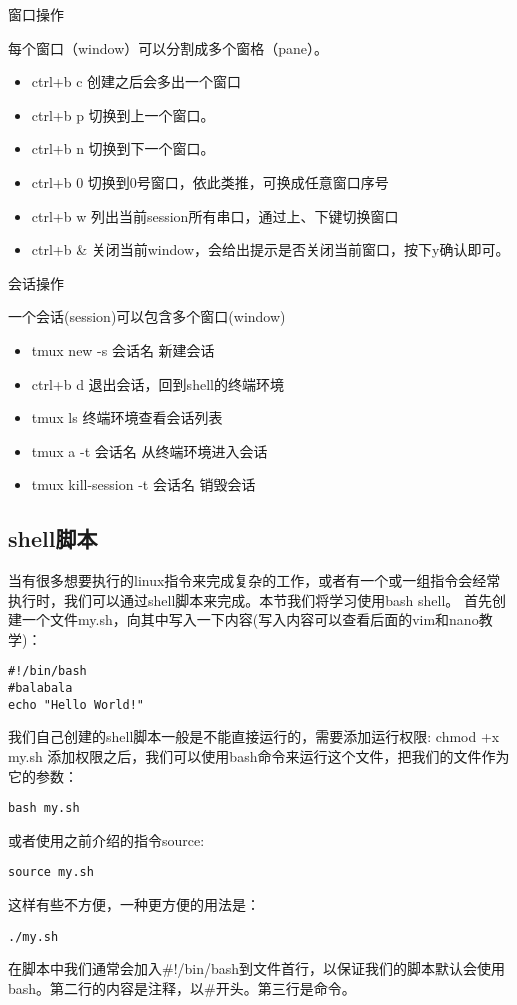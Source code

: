 窗口操作

每个窗口（window）可以分割成多个窗格（pane）。
\begin{itemize}
\item ctrl+b c 创建之后会多出一个窗口
\item ctrl+b p 切换到上一个窗口。
\item ctrl+b n 切换到下一个窗口。
\item ctrl+b 0 切换到0号窗口，依此类推，可换成任意窗口序号
\item ctrl+b w 列出当前session所有串口，通过上、下键切换窗口
\item ctrl+b \& 关闭当前window，会给出提示是否关闭当前窗口，按下y确认即可。
\end{itemize}
会话操作

一个会话(session)可以包含多个窗口(window)
\begin{itemize}
\item tmux new -s 会话名    新建会话
\item ctrl+b d    退出会话，回到shell的终端环境
\item tmux ls    终端环境查看会话列表
\item tmux a -t 会话名    从终端环境进入会话
\item tmux kill-session -t 会话名    销毁会话
\end{itemize}
\subsection{shell脚本}
当有很多想要执行的linux指令来完成复杂的工作，或者有一个或一组指令会经常执行时，我们可以通过shell脚本来完成。本节我们将学习使用bash shell。
首先创建一个文件my.sh，向其中写入一下内容(写入内容可以查看后面的vim和nano教学)：
\begin{verbatim}
#!/bin/bash
#balabala
echo "Hello World!"
\end{verbatim}
我们自己创建的shell脚本一般是不能直接运行的，需要添加运行权限:
chmod +x my.sh
添加权限之后，我们可以使用bash命令来运行这个文件，把我们的文件作为它的参数：
\begin{verbatim}
bash my.sh
\end{verbatim}
或者使用之前介绍的指令source:
\begin{verbatim}
source my.sh
\end{verbatim}
这样有些不方便，一种更方便的用法是：
\begin{verbatim}
./my.sh
\end{verbatim}
在脚本中我们通常会加入\#!/bin/bash到文件首行，以保证我们的脚本默认会使用bash。第二行的内容是注释，以\#开头。第三行是命令。

